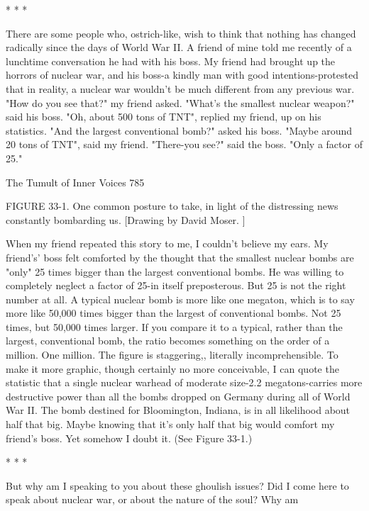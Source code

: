                                        *   *   *

        There are some people who, ostrich-like, wish to think that nothing has
changed radically since the days of World War II. A friend of mine told me recently
of a lunchtime conversation he had with his boss. My friend had brought up the
horrors of nuclear war, and his boss-a kindly man with good intentions-protested that
in reality, a nuclear war wouldn't be much different from any previous war. "How do
you see that?" my friend asked. "What's the smallest nuclear weapon?" said his boss.
"Oh, about 500 tons of TNT", replied my friend, up on his statistics. "And the largest
conventional bomb?" asked his boss. "Maybe around 20 tons of TNT", said my friend.
"There-you see?" said the boss. "Only a factor of 25."




The Tumult of Inner Voices                                                          785

FIGURE 33-1. One common posture to take, in light of the distressing news
constantly bombarding us. [Drawing by David Moser. ]

         When my friend repeated this story to me, I couldn't believe my ears. My
friend's' boss felt comforted by the thought that the smallest nuclear bombs are "only"
25 times bigger than the largest conventional bombs. He was willing to completely
neglect a factor of 25-in itself preposterous. But 25 is not the right number at all. A
typical nuclear bomb is more like one megaton, which is to say more like 50,000
times bigger than the largest of conventional bombs. Not 25 times, but 50,000 times
larger. If you compare it to a typical, rather than the largest, conventional bomb, the
ratio becomes something on the order of a million. One million. The figure is
staggering,, literally incomprehensible. To make it more graphic, though certainly no
more conceivable, I can quote the statistic that a single nuclear warhead of moderate
size-2.2 megatons-carries more destructive power than all the bombs dropped on
Germany during all of World War II. The bomb destined for Bloomington, Indiana, is
in all likelihood about half that big. Maybe knowing that it's only half that big would
comfort my friend's boss. Yet somehow I doubt it. (See Figure 33-1.)

                                       *   *   *

       But why am I speaking to you about these ghoulish issues? Did I come here to
speak about nuclear war, or about the nature of the soul? Why am




